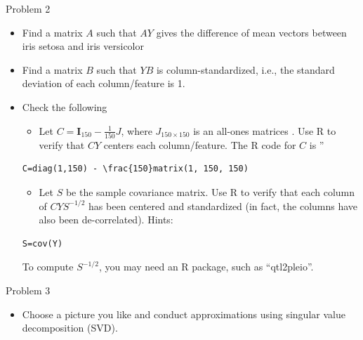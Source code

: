 \documentclass[
  ignorenonframetext,
]{beamer}
\providecommand{\tightlist}{%
  \setlength{\itemsep}{0pt}\setlength{\parskip}{0pt}}
\begin{document}
\begin{frame}[fragile]{Problem 2}
\protect\hypertarget{problem-2}{}
\begin{itemize}
\tightlist
\item
  Find a matrix \(A\) such that \(AY\) gives the difference of mean
  vectors between iris setosa and iris versicolor
\item
  Find a matrix \(B\) such that \(YB\) is column-standardized, i.e., the
  standard deviation of each column/feature is 1.
\item
  Check the following

  \begin{itemize}
  \tightlist
  \item
    Let \(C=\mathbf I_{150} - \frac{1}{150}J\), where
    \(J_{150\times 150}\) is an all-ones matrices . Use R to verify that
    \(CY\) centers each column/feature. The R code for \(C\) is ''
  \end{itemize}

\begin{verbatim}
C=diag(1,150) - \frac{150}matrix(1, 150, 150)
\end{verbatim}

  \begin{itemize}
  \tightlist
  \item
    Let \(S\) be the sample covariance matrix. Use R to verify that each
    column of \(CYS^{-1/2}\) has been centered and standardized (in
    fact, the columns have also been de-correlated). Hints:
  \end{itemize}

\begin{verbatim}
S=cov(Y)
\end{verbatim}

  To compute \(S^{-1/2}\), you may need an R package, such as
  ``qtl2pleio''.
\end{itemize}
\end{frame}

\begin{frame}{Problem 3}
\protect\hypertarget{problem-3}{}
\begin{itemize}
\tightlist
\item
  Choose a picture you like and conduct approximations using singular
  value decomposition (SVD).
\end{itemize}
\end{frame}
\end{document}
